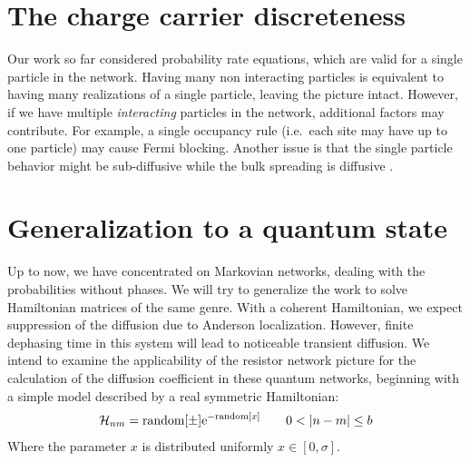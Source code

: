 \section{The charge carrier discreteness}\label{sec:discreteness}

Our work so far considered probability rate equations, which are valid for a single particle in the network.
Having many non interacting particles is equivalent to having many realizations of a single particle,
leaving the picture intact. However, if we have multiple \emph{interacting} particles in the network, additional factors may contribute. For example,
a single occupancy rule (i.e.\ each site may have up to one particle) may cause Fermi blocking. Another
issue is that the single particle behavior might be sub-diffusive while the bulk spreading is diffusive \cite{richards_theory_1977,hung_diffusion_2012}.


\section{Generalization to a quantum state}

Up to now, we have concentrated on Markovian networks, dealing with the probabilities without phases.
We will try to generalize the work to solve Hamiltonian matrices of the same genre.
With a coherent Hamiltonian, 
we expect suppression of the diffusion due to Anderson localization. However, finite
dephasing time in this system will lead to noticeable transient diffusion.
We intend to examine the applicability of the resistor network picture for 
the calculation of the diffusion coefficient in these quantum networks, beginning with
a simple model described by a real symmetric Hamiltonian:
%
\begin{align}
  \mathcal{H}_{nm} = \textrm{random}[\pm] \eexp{-\textrm{random}[x]} \qquad 0<|n-m|\le b
\end{align}
%
Where the parameter $x$ is distributed uniformly $x\in [0,\sigma]$. 




